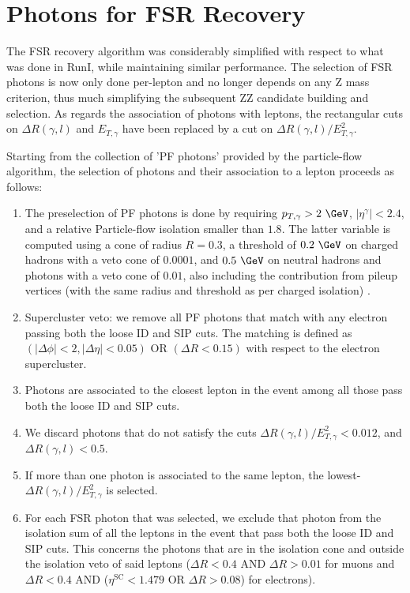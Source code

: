 
\section{Photons for FSR Recovery}\label{sec:FSRphotons}
The FSR recovery algorithm was considerably simplified with respect to what was done in RunI, while maintaining similar performance. The selection of FSR 
photons is now only done per-lepton and no longer depends on any Z mass criterion, thus much simplifying the subsequent ZZ candidate building and selection. 
As regards the association of photons with leptons, the rectangular cuts on $\Delta R(\gamma,l)$ and $E_{T,\gamma}$  have been replaced by a cut on
$\Delta R(\gamma,l)/E_{T,\gamma}^{2}$.

Starting from the collection of 'PF photons' provided by the particle-flow algorithm, the selection of photons and their association to a lepton proceeds as
follows:
\begin{enumerate}
\item The preselection of PF photons is done by requiring $p_{T,\gamma} > 2~\GeV$, $|\eta^{\gamma}| < 2.4$, and a relative Particle-flow isolation smaller
than $1.8$. The latter variable is computed using a cone of radius $R=0.3$, a threshold of $0.2~\GeV$ on charged hadrons with a veto cone of $0.0001$, and
$0.5~\GeV$ on neutral hadrons and photons with a veto cone of $0.01$, also including the contribution from pileup vertices (with the same radius and 
threshold as per charged isolation) .
\item Supercluster veto: we remove all PF photons that match with any electron passing both the loose ID and SIP cuts. The matching is defined 
as $(|\Delta \phi| < 2, |\Delta \eta| < 0.05)$ OR $(\Delta R < 0.15)$ with respect to the electron supercluster.
\item Photons are associated to the closest lepton in the event among all those pass both the loose ID and SIP cuts.
\item We discard photons that do not satisfy the cuts $\Delta R(\gamma,l)/E_{T,\gamma}^2 < 0.012$, and $\Delta R(\gamma,l)<0.5$.
\item If more than one photon is associated to the same lepton, the lowest-$\Delta R(\gamma,l)/E_{T,\gamma}^2$ is selected.
\item For each FSR photon that was selected, we exclude that photon from the isolation sum of all the leptons in the event that pass both the loose ID 
and SIP cuts. This concerns the photons that are in the isolation cone and outside the isolation veto of said leptons
($\Delta R < 0.4$ AND $\Delta R > 0.01$ for muons and $\Delta R < 0.4$ AND ($\eta^{\text{SC}} < 1.479$ OR $\Delta R > 0.08$) for electrons).
\end{enumerate}

